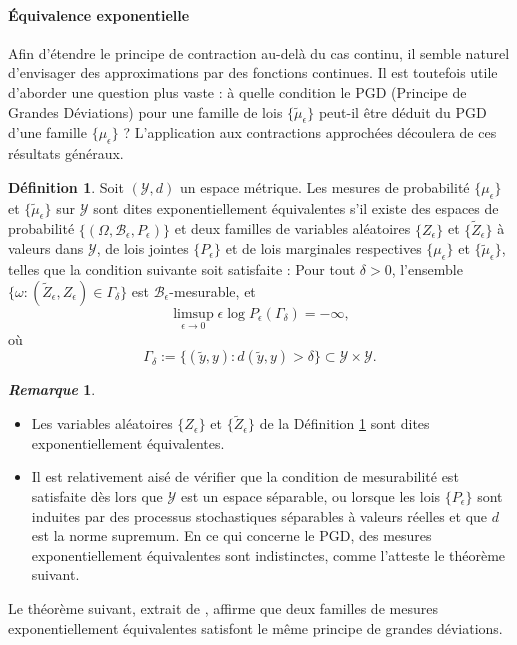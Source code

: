 \documentclass[12pt,a4paper,twoside]{book}%
\theoremstyle{definition}
\newtheorem{dfn}{Définition}[section]
\newtheorem{rem}{\textit{Remarque}}[section]
\numberwithin{equation}{section}
\begin{document}
\paragraph{Équivalence exponentielle} 
Afin d'étendre le principe de contraction au-delà du cas continu, il semble naturel d'envisager des approximations par des fonctions continues. Il est toutefois utile d'aborder une question plus vaste : à quelle condition le PGD (Principe de Grandes Déviations) pour une famille de lois $\{\tilde{\mu}_\epsilon\}$ peut-il être déduit du PGD d'une famille $\{\mu_\epsilon\}$ ? L'application aux contractions approchées découlera de ces résultats généraux.
\begin{dfn}\label{def_exp_equ}
	Soit $(\mathcal{Y},d)$ un espace métrique. Les mesures de probabilité $\{\mu_\epsilon\}$ et $\{\tilde{\mu}_\epsilon\}$ sur $\mathcal{Y}$ sont dites exponentiellement équivalentes s'il existe des espaces de probabilité $\{(\Omega, \mathcal{B}_\epsilon, P_\epsilon)\}$ et deux familles de variables aléatoires $\{Z_\epsilon\}$ et $\{\tilde{Z}_\epsilon\}$ à valeurs dans $\mathcal{Y}$, de lois jointes $\{P_\epsilon\}$ et de lois marginales respectives $\{\mu_\epsilon\}$ et $\{\tilde{\mu}_\epsilon\}$, telles que la condition suivante soit satisfaite :
	Pour tout $\delta> 0$, l'ensemble $\{\omega : (\tilde{Z}_\epsilon, Z_\epsilon) \in \Gamma_\delta\}$ est $\mathcal{B}_\epsilon$-mesurable, et 
	\begin{equation}
		\limsup_{\epsilon \to 0} \epsilon \log P_\epsilon(\Gamma_\delta) = -\infty,
	\end{equation}
	où
	\begin{equation}
		\Gamma_\delta := \{(\tilde{y}, y) : d(\tilde{y}, y) > \delta\} \subset \mathcal{Y} \times \mathcal{Y}.
	\end{equation}
\end{dfn}
\begin{rem}
	\begin{itemize}
		\item [(a)] Les variables aléatoires $\{Z_\epsilon\}$ et $\{\tilde{Z}_\epsilon\}$ de la Définition \ref{def_exp_equ} sont dites exponentiellement équivalentes.
		\item [(b)] Il est relativement aisé de vérifier que la condition de mesurabilité est satisfaite dès lors que $\mathcal{Y}$ est un espace séparable, ou lorsque les lois $\{P_\epsilon\}$ sont induites par des processus stochastiques séparables à valeurs réelles et que $d$ est la norme supremum. En ce qui concerne le PGD, des mesures exponentiellement équivalentes sont indistinctes, comme l'atteste le théorème suivant.
	\end{itemize}
\end{rem}
Le théorème suivant, extrait de \cite{[8]}, affirme que deux familles de mesures exponentiellement équivalentes satisfont le même principe de grandes déviations.
\end{document}
